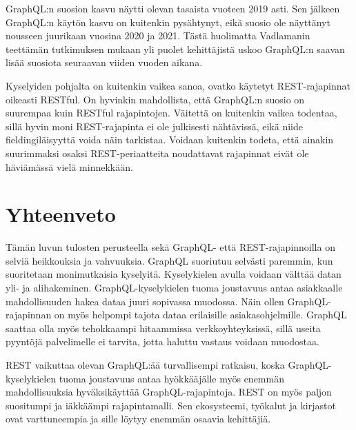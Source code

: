 GraphQL:n suosion kasvu näytti olevan tasaista vuoteen 2019 asti. Sen jälkeen GraphQL:n käytön kasvu on kuitenkin pysähtynyt, eikä suosio ole näyttänyt nousseen juurikaan vuosina 2020 ja 2021. Tästä huolimatta Vadlamanin \cite{vadlamani2021} teettämän tutkimuksen mukaan yli puolet kehittäjistä uskoo GraphQL:n saavan lisää suosiota seuraavan viiden vuoden aikana. \cite{statejs-report, smartbear-report, postman-report}

Kyselyiden pohjalta on kuitenkin vaikea sanoa, ovatko käytetyt REST-rajapinnat oikeasti RESTful. On hyvinkin mahdollista, että GraphQL:n suosio on suurempaa kuin RESTful rajapintojen. Väitettä on kuitenkin vaikea todentaa, sillä hyvin moni REST-rajapinta ei ole julkisesti nähtävissä, eikä niide fieldingiläisyyttä voida näin tarkistaa. Voidaan kuitenkin todeta, että ainakin suurimmaksi osaksi REST-periaatteita noudattavat rajapinnat eivät ole häviämässä vielä minnekkään.

\section{Yhteenveto}

Tämän luvun tulosten perusteella sekä GraphQL- että REST-rajapinnoilla on selviä heikkouksia ja vahvuuksia. GraphQL suoriutuu selvästi paremmin, kun suoritetaan monimutkaisia kyselyitä. Kyselykielen avulla voidaan välttää datan yli- ja alihakeminen. GraphQL-kyselykielen tuoma joustavuus antaa asiakkaalle mahdollisuuden hakea dataa juuri sopivassa muodossa. Näin ollen GraphQL-rajapinnan on myös helpompi tajota dataa erilaisille asiakasohjelmille. GraphQL saattaa olla myös tehokkaampi hitaammissa verkkoyhteyksissä, sillä useita pyyntöjä palvelimelle ei tarvita, jotta haluttu vastaus voidaan muodostaa.

REST vaikuttaa olevan GraphQL:ää turvallisempi ratkaisu, koska GraphQL-kyselykielen tuoma joustavuus antaa hyökkääjälle myös enemmän mahdollisuuksia hyväksikäyttää GraphQL-rajapintoja. REST on myös paljon suositumpi ja iäkkäämpi rajapintamalli. Sen ekosysteemi, työkalut ja kirjastot ovat varttuneempia ja sille löytyy enemmän osaavia kehittäjiä.